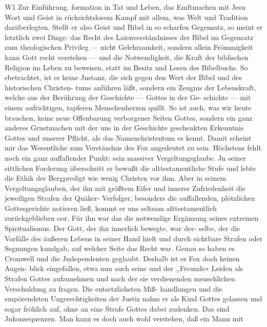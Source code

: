 W1 Zur Einführung.
formation in Tat und Leben, das Emftmachen mit Jesu Wort
und Geist in rücksichtslosem Kampf mit allem, was Welt und
Tradition dariiberlegten. Stellt er also Geist und Bibel in so
scharfen Gegensatz, so meint er letztlich zwei Dinge: das Recht
des Laienverständnisses der Bibel im Gegensatz zum theologischen
Privileg — nicht Gelehrsamkeit, sondern allein Frömmigkeit kann
Gott recht verstehen — und die Notwendigkeit, die Kraft der
biblischen Religion im Leben zu beweisen, statt im Besitz und
Lesen des Bibelbuchs. So sbetrachtet, ist er keine Jnstanz, die
sich gegen den Wert der Bibel und des historischen Christen-
tums anführen läßt, sondern ein Zeugnis der Lebenskraft,
welche aus der Berührung der Geschichte — Gottes in der Ge-
schichte — mit einem aufrichtigen, tapferen Menschenherzen quillt.
So ist auch, was wir heute brauchen, keine neue Offenbarung
verborgener Seiten Gottes, sondern ein ganz anderes Grnstmachen
mit der uns in der Geschichte geschenkten Erkenntnis Gottes und
unserer Pflicht, als das Namenchristentum es kennt.
Damit scheint mir das Wesentliche zum Verständnis des Fox
angedeutet zu sein. Höchstens fehlt noch ein ganz auffallender
Punkt: sein massiver Vergeltungsglaube. Jn seiner sittlichen
Forderung iiberschritt er bewußt die alttestamentliche Stufe und
lebte die Ethik der Bergpredigt wie wenig Christen vor ihm.
Aber in seinem Vergeltungsglauben, der ihn mit größtem Eifer
und innerer Zufriedenheit die jeweiligen Strafen der Quäker-
Verfolger, besonders die auffallenden, plötzlichen Gottesgerichte
notieren ließ, kommt er uns seltsam alttestamentlich zurückgeblieben
oor. Für ihn war das die notwendige Ergänzung seines extremen
Spiritualismus. Der Gott, der ihn innerlich bewegte, war der-
selbe, der die Vorfälle des äußeren Lebens in seiner Hand hielt
und durch sichtbare Strafen oder Segnungen kundgab, auf welcher
Seite das Recht war. Genau so haben es Cromwell und die
Jndependenten geglaubt. Deshalb ist es Fox doch keinen Augen-
blick eingefallen, etwa nun auch seine und der ,,Freunde« Leiden
als Strafen Gottes aufzunehmen und nach der sie verdienenden
menschlichen Verschuldung zu fragen. Die entsetzlichsten Miß-
handlungen und die empörendsten Ungerechtigkeiten der Justiz
nahm er als Kind Gottes gelassen und sogar fröhlich auf, ohne
an eine Strafe Gottes dabei zudenken. Das sind Jnkonsequenzen.
Man kann es doch auch wohl verstehen, daß ein Mann mit


